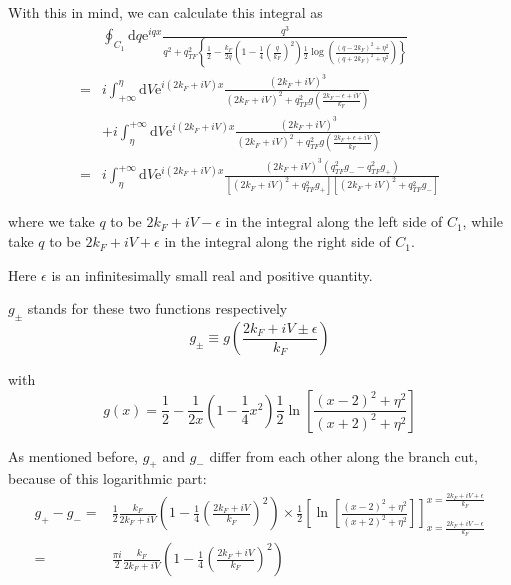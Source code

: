 \begin{itemize}
With this in mind, we can calculate this integral as
\begin{equation} \label{Eqs3.1.33} \begin{split}
&\oint_{C_1} \mathrm{d} q \mathrm{e}^{i q x} \frac{q^3}{q^2 + q_{TF}^2 \left\{\frac{1}{2}-\frac{k_F}{2q}\left( 1-\frac{1}{4}(\frac{q}{k_F})^2 \right) \frac{1}{2} \log \left( \frac{(q-2 k_F)^2 + \eta^2}{(q + 2 k_F)^2 + \eta^2}\right) \right\}}\\
=& i \int_{+\infty}^{\eta} \mathrm{d} V \mathrm{e}^{i(2 k_F+i V) x} \frac{(2 k_F+i V)^3}{(2 k_F+i V)^2 + q_{TF}^2 g\left( \frac{2 k_F - \epsilon + i V}{k_F} \right)}\\
&+i \int_{\eta}^{+\infty} \mathrm{d} V \mathrm{e}^{i(2 k_F+i V) x} \frac{(2 k_F+i V)^3}{(2 k_F+i V)^2 + q_{TF}^2 g\left( \frac{2 k_F + \epsilon + i V}{k_F} \right)}\\
=& i \int_{\eta}^{+\infty} \mathrm{d}V \mathrm{e}^{i(2 k_F+i V) x} \frac{(2 k_F+i V)^3\left( q_{TF}^2 g_- - q_{TF}^2 g_+ \right)}{\left[(2 k_F+i V)^2 + q_{TF}^2 g_+ \right]\left[(2 k_F+i V)^2 + q_{TF}^2 g_- \right]}
\end{split} \end{equation}

where we take $q$ to be $2 k_F +i V -\epsilon$ in the integral along the left side of $C_1$, while take $q$ to be $2 k_F +i V + \epsilon$ in the integral along the right side of $C_1$.

Here $\epsilon$ is an infinitesimally small real and positive quantity.

$g_\pm$ stands for these two functions respectively
\[ g_\pm \equiv g\left( \frac{2 k_F + i V \pm \epsilon}{k_F} \right) \]

with
\[ g(x) = \frac{1}{2} - \frac{1}{2x} \left( 1- \frac{1}{4}x^2 \right) \frac{1}{2} \ln\left[ \frac{(x-2)^2 + \eta^2}{(x+2)^2+\eta^2} \right] \]

As mentioned before, $g_+$ and $g_-$ differ from each other along the branch cut, because of this logarithmic part:
\[\begin{split}
g_+-g_- = & \frac{1}{2} \frac{k_F}{2 k_F + i V} \left( 1- \frac{1}{4}\left( \frac{2 k_F +i V}{k_F} \right)^2 \right) \times \frac{1}{2} \left[ \ln \left[ \frac{(x-2)^2+\eta^2}{(x+2)^2+\eta^2}\right] \right]_{x=\frac{2 k_F +i V -\epsilon}{k_F}}^{x=\frac{2 k_F +i V +\epsilon}{k_F}}\\
=& \frac{\pi i}{2} \frac{k_F}{2 k_F + i V} \left( 1- \frac{1}{4}\left( \frac{2 k_F +i V}{k_F} \right)^2 \right)
\end{split}\]


\end{itemize}
